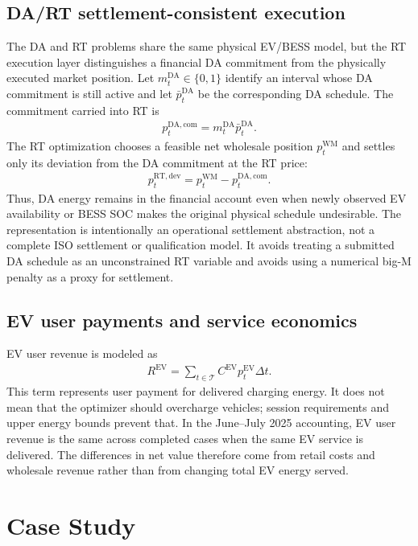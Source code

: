 \documentclass[final,5p,times]{elsarticle}
\newcommand{\DeltaT}{\Delta t}
\newcommand{\EV}{\mathrm{EV}}
\newcommand{\DA}{\mathrm{DA}}
\newcommand{\RT}{\mathrm{RT}}
\newcommand{\WM}{\mathrm{WM}}
\newcommand{\calT}{\mathcal{T}}
\begin{document}
\subsection{DA/RT settlement-consistent execution}
The DA and RT problems share the same physical EV/BESS model, but the RT execution layer distinguishes a financial DA commitment from the physically executed market position. Let $m_t^{\DA}\in\{0,1\}$ identify an interval whose DA commitment is still active and let $\bar p_t^{\DA}$ be the corresponding DA schedule. The commitment carried into RT is
\begin{align}
p_t^{\DA,\mathrm{com}}=m_t^{\DA}\bar p_t^{\DA}.
\label{eq:da_commitment}
\end{align}
The RT optimization chooses a feasible net wholesale position $p_t^{\WM}$ and settles only its deviation from the DA commitment at the RT price:
\begin{align}
p_t^{\RT,\mathrm{dev}}=p_t^{\WM}-p_t^{\DA,\mathrm{com}}.
\label{eq:rt_deviation}
\end{align}
Thus, DA energy remains in the financial account even when newly observed EV availability or BESS SOC makes the original physical schedule undesirable. The representation is intentionally an operational settlement abstraction, not a complete ISO settlement or qualification model. It avoids treating a submitted DA schedule as an unconstrained RT variable and avoids using a numerical big-M penalty as a proxy for settlement.
\subsection{EV user payments and service economics}
EV user revenue is modeled as
\begin{align}
R^{\EV}=\sum_{t\in\calT} C^{\EV}p_t^{\EV}\DeltaT.
\label{eq:ev_revenue_main}
\end{align}
This term represents user payment for delivered charging energy. It does not mean that the optimizer should overcharge vehicles; session requirements and upper energy bounds prevent that. In the June--July 2025 accounting, EV user revenue is the same across completed cases when the same EV service is delivered. The differences in net value therefore come from retail costs and wholesale revenue rather than from changing total EV energy served.

\section{Case Study}
\label{sec:case_study}
\end{document}
